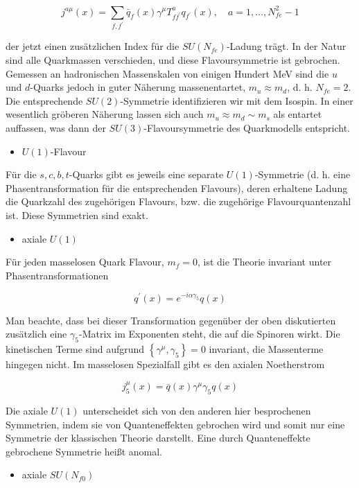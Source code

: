 \documentclass[10pt, letterpaper]{article}
\begin{document}
$$
j^{a \mu}(x)=\sum_{f, f^{\prime}} \bar{q}_{f}(x) \gamma^{\mu} T_{f f^{\prime}}^{a} q_{f^{\prime}}(x), \quad a=1, \ldots, N_{f e}^{2}-1
$$

der jetzt einen zusätzlichen Index für die $S U\left(N_{f e}\right)$-Ladung trägt. In der Natur sind alle Quarkmassen verschieden, und diese Flavoursymmetrie ist gebrochen. Gemessen an hadronischen Massenskalen von einigen Hundert MeV sind die $u$ und $d$-Quarks jedoch in guter Näherung massenentartet, $m_{u} \approx m_{d}$, d. h. $N_{f e}=2$. Die entsprechende $S U(2)$-Symmetrie identifizieren wir mit dem Isospin. In einer wesentlich gröberen Näherung lassen sich auch $m_{u} \approx m_{d} \sim m_{s}$ als entartet auffassen, was dann der $S U(3)$-Flavoursymmetrie des Quarkmodells entspricht.

\begin{itemize}
  \item $U(1)$-Flavour
\end{itemize}

Für die $s, c, b, t$-Quarks gibt es jeweils eine separate $U(1)$-Symmetrie (d. h. eine Phasentransformation für die entsprechenden Flavours), deren erhaltene Ladung die Quarkzahl des zugehörigen Flavours, bzw. die zugehörige Flavourquantenzahl ist. Diese Symmetrien sind exakt.

\begin{itemize}
  \item axiale $U(1)$
\end{itemize}

Für jeden masselosen Quark Flavour, $m_{f}=0$, ist die Theorie invariant unter Phasentransformationen

$$
q^{\prime}(x)=e^{-i \alpha \gamma_{5}} q(x)
$$

Man beachte, dass bei dieser Transformation gegenüber der oben diskutierten zusätzlich eine $\gamma_{5}$-Matrix im Exponenten steht, die auf die Spinoren wirkt. Die kinetischen Terme sind aufgrund $\left\{\gamma^{\mu}, \gamma_{5}\right\}=0$ invariant, die Massenterme hingegen nicht. Im masselosen Spezialfall gibt es den axialen Noetherstrom

$$
j_{5}^{\mu}(x)=\bar{q}(x) \gamma^{\mu} \gamma_{5} q(x)
$$

Die axiale $U(1)$ unterscheidet sich von den anderen hier besprochenen Symmetrien, indem sie von Quanteneffekten gebrochen wird und somit nur eine Symmetrie der klassischen Theorie darstellt. Eine durch Quanteneffekte gebrochene Symmetrie heißt anomal.

\begin{itemize}
  \item axiale $S U\left(N_{f 0}\right)$
\end{itemize}
\end{document}
